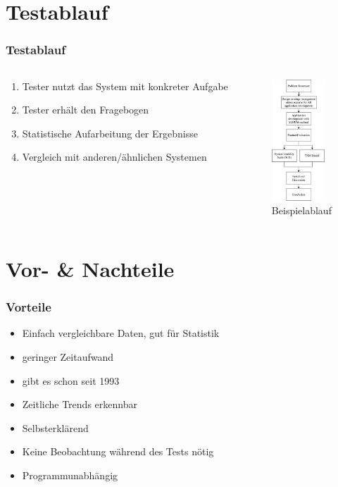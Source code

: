 \documentclass[12pt, aspectratio=169]{beamer}
\begin{document}
\section{Testablauf}
\begin{frame}
	\frametitle{Testablauf}
	\begin{columns}
		\begin{column}{0.7\textwidth}
			\begin{enumerate}
				\item<1> Tester nutzt das System mit konkreter Aufgabe
				\item<1> Tester erhält den Fragebogen
				\item<1> Statistische Aufarbeitung der Ergebnisse
				\item<1> Vergleich mit anderen/ähnlichen Systemen
			\end{enumerate}
		\end{column}
		\begin{column}{0.3\textwidth}
			\begin{figure}
				\centering
				\includegraphics[keepaspectratio=true, width=75px]{./image/ablauf.png}
				\caption{Beispielablauf \tiny{\cite{young2009cultivating}}}
			\end{figure}		
		\end{column}
	\end{columns}
\end{frame}

\section{Vor- \& Nachteile}
\begin{frame}
	\frametitle{Vorteile}
	\begin{itemize}
		\item<1> Einfach vergleichbare Daten, gut für Statistik
		\item<1> geringer Zeitaufwand
		\item<1> gibt es schon seit 1993
		\item<1> Zeitliche Trends erkennbar
		\item<1> Selbsterklärend
		\item<1> Keine Beobachtung während des Tests nötig
		\item<1> Programmunabhängig
	\end{itemize}
\end{frame}
\end{document}
